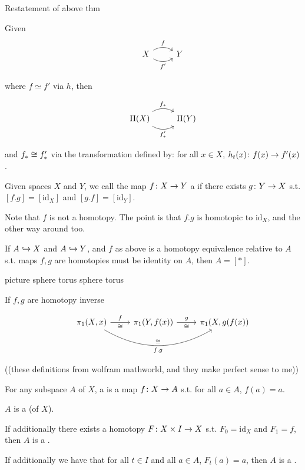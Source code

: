 \documentclass[11pt,leqno,oneside]{amsart}
\numberwithin{thm}{section}
\newcommand{\homotopic}{\simeq}
\newcommand{\fund}[1][1]{\pi_{#1}}
\newcommand{\x}{\times}
\newcommand{\id}{\text{id}}
\begin{document}
\begin{thm}
  Restatement of above thm

  Given
  $$\begin{tikzcd}
    &X \arrow[r, bend left, "f"] \arrow[r, bend right, "f'"'] &Y
  \end{tikzcd}$$

  where $f \homotopic f'$ via $h$, then

  $$\begin{tikzcd}
    &\Pi(X) \arrow[r, bend left, "f_*"] \arrow[r, bend right, "f_*'"'] &\Pi(Y)
  \end{tikzcd}$$

  and $f_* \mathrel{\cong} f_*'$ via the transformation defined by: for all $x \in X$, $h_t(x)\colon f(x) \to f'(x)$.
\end{thm}
\begin{defn}
  Given spaces $X$ and $Y$, we call the map $f\colon X \to Y$ a  if there exists $g\colon Y \to X$ s.t. $[f.g] = [\id_X]$ and $[g.f] = [\id_Y]$.
\end{defn}
\begin{rmk}
  Note that $f$ is not a homotopy.  The point is that $f.g$ is homotopic to $\id_X$, and the other way around too.
\end{rmk}
\begin{rmk}
  If $A \hookrightarrow X$ and $A \hookrightarrow Y$, and $f$ as above is a homotopy equivalence relative to $A$ s.t. maps $f,g$ are homotopies must be identity on $A$, then $A = [*]$.

  picture
  sphere torus
  sphere torus

  If $f,g$ are homotopy inverse

  $$\begin{tikzcd}
    &\fund(X,x) \arrow[r, "f", "\isom"'] \arrow[rr, bend right, "\isom", "f.g"'] &\fund(Y, f(x)) \arrow[r, "g", "\isom"'] &\fund(X, g(f(x))
  \end{tikzcd}$$
\end{rmk}
\begin{defn}
  ((these definitions from wolfram mathworld, and they make perfect sense to me))

  For any subspace $A$ of $X$, a  is a map $f\colon X \to A$ s.t. for all $a \in A$, $f(a) = a$.

  $A$ is a  (of $X$).

  If additionally there exists a homotopy $F\from X \x I \to X$ s.t. $F_0 = \id_X$ and $F_1 = f$, then $A$ is a .

  If additionally we have that for all $t \in I$ and all $a \in A$, $F_t(a) = a$, then $A$ is a .
\end{defn}
\end{document}
